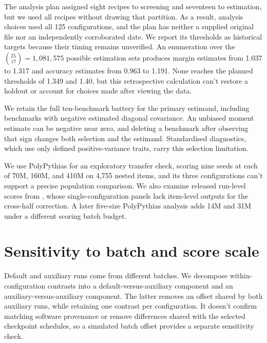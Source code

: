\documentclass{article}
\begin{document}
The analysis plan assigned eight recipes to screening and seventeen to estimation, but we used all recipes without drawing that partition. As a result, analysis choices used all 125 configurations, and the plan has neither a supplied original file nor an independently corroborated date. We report its thresholds as historical targets because their timing remains unverified. An enumeration over the $\binom{25}{17}=1{,}081{,}575$ possible estimation sets produces margin estimates from 1.037 to 1.317 and accuracy estimates from 0.963 to 1.191. None reaches the planned thresholds of 1.349 and 1.40, but this retrospective calculation can't restore a holdout or account for choices made after viewing the data.

We retain the full ten-benchmark battery for the primary estimand, including benchmarks with negative estimated diagonal covariance. An unbiased moment estimate can be negative near zero, and deleting a benchmark after observing that sign changes both selection and the estimand. Standardised diagnostics, which use only defined positive-variance traits, carry this selection limitation.

We use PolyPythias \citep{vanderwal2025} for an exploratory transfer check, scoring nine seeds at each of 70M, 160M, and 410M on 4,755 nested items, and its three configurations can't support a precise population comparison. We also examine released run-level scores from \citet{heineman2025}, whose single-configuration panels lack item-level outputs for the cross-half correction. A later five-size PolyPythias analysis adds 14M and 31M under a different scoring batch budget.

\section{Sensitivity to batch and score scale}
Default and auxiliary runs come from different batches. We decompose within-configuration contrasts into a default-versus-auxiliary component and an auxiliary-versus-auxiliary component. The latter removes an offset shared by both auxiliary runs, while retaining one contrast per configuration. It doesn't confirm matching software provenance or remove differences shared with the selected checkpoint schedules, so a simulated batch offset provides a separate sensitivity check.
\end{document}

